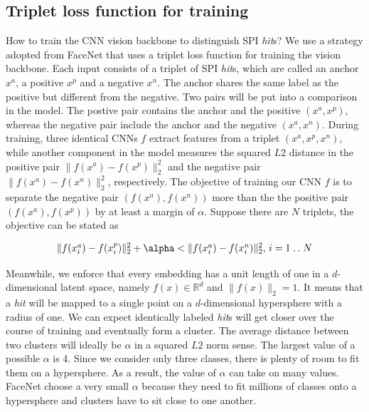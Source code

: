\subsection{Triplet loss function for training}

How to train the CNN vision backbone to distinguish SPI \textit{hit}s?  We use a strategy
adopted from FaceNet \cite{schroffFaceNetUnifiedEmbedding2015} that uses a
triplet loss function for training the vision backbone.  Each input consists of
a triplet of SPI \textit{hit}s, which are called an anchor $x^a$, a positive $x^p$ and a
negative $x^n$. The anchor shares the same label as the positive but different
from the negative.  Two pairs will be put into a comparison in the model. The
postive pair contains the anchor and the positive $(x^a, x^p)$, whereas the
negative pair include the anchor and the negative $(x^a, x^n)$.  During training,
three identical CNNs $f$ extract features from a triplet $(x^a, x^p, x^n)$,
while another component in the model measures the squared $L2$ distance in the
positive pair $\|f(x^a) - f(x^p)\|_2^2$ and the negative pair $\|f(x^a) - f(x^n)
\|_2^2$, respectively.  The objective of training our CNN $f$ is to separate the
negative pair $(f(x^a), f(x^n))$ more than the the positive pair $(f(x^a),
f(x^p))$ by at least a margin of $\alpha$.  Suppose there are $N$ triplets, the
objective can be stated as 

\newcommand{\isep}{\mathrel{{.}\,{.}}\nobreak}
\begin{equation} \label{eq:objective}
    \begin{array}{l}
       \|f(x_i^a) - f(x_i^p)\|_2^2 + \alpha < \|f(x_i^a) - f(x_i^n)\|_2^2, \, i = 1 \isep N
    \end{array}
\end{equation}

Meanwhile, we enforce that every embedding has a unit length of one in a
$d$-dimensional latent space, namely $f(x) \in \mathbb{R}^d$ and $\|f(x)
\|_2=1$. It means that a \textit{hit} will be mapped to a single point on a
$d$-dimensional hypersphere with a radius of one.  We can expect identically
labeled \textit{hit}s will get closer over the course of training and eventually
form a cluster.  The average distance between two clusters will ideally be
$\alpha$ in a squared $L2$ norm sense. The largest value of a possible $\alpha$
is 4. Since we consider only three classes, there is plenty of room to fit them
on a hypersphere.  As a result, the value of $\alpha$ can take on many values.
FaceNet choose a very small $\alpha$ because they need to fit millions of
classes onto a hypersphere and clusters have to sit close to one another.  

